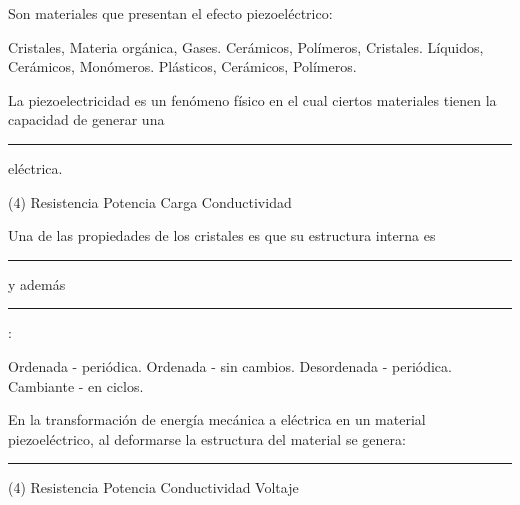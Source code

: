\documentclass[12pt, letter]{exam}
\begin{document}
\begin{questions}
    \question Son materiales que presentan el efecto piezoeléctrico:
    \begin{multicols}{2}
    \begin{tasks}
        \task Cristales, Materia orgánica, Gases.
        \task Cerámicos, Polímeros, Cristales.
        \task Líquidos, Cerámicos, Monómeros.
        \task Plásticos, Cerámicos, Polímeros.
    \end{tasks}
    \end{multicols}
    \question La piezoelectricidad es un fenómeno físico en el cual ciertos materiales tienen la capacidad de generar una \rule{2cm}{0.1mm} eléctrica.
    \begin{tasks}(4)
        \task Resistencia
        \task Potencia
        \task Carga
        \task Conductividad
    \end{tasks}
    \question Una de las propiedades de los cristales es que su estructura interna es \rule{2cm}{0.1mm} y además \rule{2cm}{0.1mm}:
    \begin{multicols}{2}
        \begin{tasks}
            \task Ordenada - periódica.
            \task Ordenada - sin cambios.
            \task Desordenada - periódica.
            \task Cambiante - en ciclos.
        \end{tasks}
    \end{multicols}
    \question En la transformación de energía mecánica a eléctrica en un material piezoeléctrico, al deformarse la estructura del material se genera: \rule{2cm}{0.1mm}
    \begin{tasks}(4)
        \task Resistencia
        \task Potencia
        \task Conductividad
        \task Voltaje
    \end{tasks}
    
    

    
\end{questions}

\newpage
\end{document}
